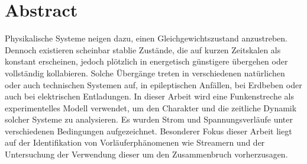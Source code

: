 \chapter*{Abstract}

Physikalische Systeme neigen dazu, einen Gleichgewichtszustand anzustreben. Dennoch existieren scheinbar stablie Zustände, die auf kurzen Zeitskalen als konstant erscheinen, jedoch plötzlich in energetisch günstigere übergehen oder vollständig kollabieren. Solche Übergänge treten in verschiedenen natürlichen oder auch technischen Systemen auf, in epileptischen Anfällen, bei Erdbeben oder auch bei elektrischen Entladungen. In dieser Arbeit wird eine Funkenstreche als experimentelles Modell verwendet, um den Charakter und die zeitliche Dynamik solcher Systeme zu analysieren. Es wurden Strom und Spannungsverläufe unter verschiedenen Bedingungen aufgezeichnet. Besonderer Fokus dieser Arbeit liegt auf der Identifikation von Vorläuferphänomenen wie Streamern und der Untersuchung der Verwendung dieser um den Zusammenbruch vorherzusagen. 
